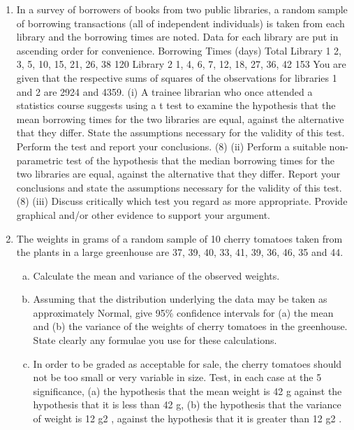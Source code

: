 \begin{enumerate}
\item In a survey of borrowers of books from two public libraries, a random sample of
borrowing transactions (all of independent individuals) is taken from each library and
the borrowing times are noted. Data for each library are put in ascending order for
convenience.
Borrowing Times (days) Total
Library 1 2, 3, 5, 10, 15, 21, 26, 38 120
Library 2 1, 4, 6, 7, 12, 18, 27, 36, 42 153
You are given that the respective sums of squares of the observations for libraries 1
and 2 are 2924 and 4359.
(i) A trainee librarian who once attended a statistics course suggests using a t test
to examine the hypothesis that the mean borrowing times for the two libraries
are equal, against the alternative that they differ. State the assumptions
necessary for the validity of this test. Perform the test and report your
conclusions.
(8)
(ii) Perform a suitable non-parametric test of the hypothesis that the median
borrowing times for the two libraries are equal, against the alternative that they
differ. Report your conclusions and state the assumptions necessary for the
validity of this test.
(8)
(iii) Discuss critically which test you regard as more appropriate. Provide
graphical and/or other evidence to support your argument.


\item The weights in grams of a random sample of 10 cherry tomatoes taken from the plants
in a large greenhouse are 37, 39, 40, 33, 41, 39, 36, 46, 35 and 44.
\begin{enumerate}[(a)]
\item  Calculate the mean and variance of the observed weights.

\item Assuming that the distribution underlying the data may be taken as
approximately Normal, give 95\% confidence intervals for (a) the mean and (b)
the variance of the weights of cherry tomatoes in the greenhouse. State clearly
any formulae you use for these calculations.

\item In order to be graded as acceptable for sale, the cherry tomatoes should not be
too small or very variable in size. Test, in each case at the 5%
significance, (a) the hypothesis that the mean weight is 42 g against the
hypothesis that it is less than 42 g, (b) the hypothesis that the variance of
weight is 12 g2
, against the hypothesis that it is greater than 12 g2
.
\end{enumerate}
\end{enumerate}


